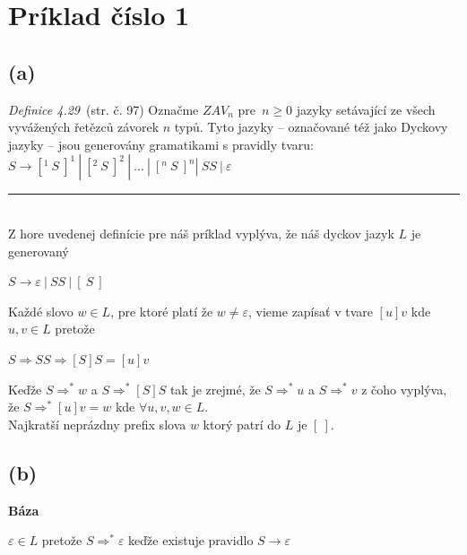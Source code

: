 \documentclass[11pt,a4paper]{article}
\begin{document}
\newpage
\section{Príklad číslo 1} %

\subsection{(a)}\label{sec:a}
\textit{Definice 4.29}~\cite{TIN}(str. č. 97) Označme $ZAV_n$ pre $n \geq 0$ jazyky setávající ze všech vyvážených řetězců závorek $n$ typů. Tyto jazyky -- označované též jako Dyckovy jazyky -- jsou generovány gramatikami s pravidly tvaru: $S \rightarrow [^{1}\ S\ ]^{1} \ |\  [^{2}\ S\ ]^{2} \ |\  ... \ |\  [^{n}\ S\ ]^{n} | \ SS \ | \ \varepsilon $

\rule{17cm}{0.4pt}

\hfill\\[-2em]

Z hore uvedenej definície pre náš príklad vyplýva, že náš dyckov jazyk $L$ je generovaný
\begin{center}
$S \rightarrow \varepsilon \ | \ SS \ | \ [\ S \ ]$
\end{center}

Každé slovo $w \in L$, pre ktoré platí že $w \neq \varepsilon$, vieme zapísať v tvare $[u]v$ kde $u,v \in L$ pretože
\begin{center}
$S \Rightarrow SS \Rightarrow [S]S = [u]v$
\end{center}

Keďže $S \Rightarrow^{*} w$ a $S \Rightarrow^{*} [S]S$ tak je zrejmé, že $S \Rightarrow^{*} u$ a $S \Rightarrow^{*} v$ z čoho vyplýva, že $S \Rightarrow^{*} [u]v = w$ kde $\forall u,v,w \in L$.\\

Najkratší neprázdny prefix slova $w$ ktorý patrí do $L$ je $[\ ]$.

\subsection{(b)}

\textbf{Báza}
\begin{flushright}
\begin{minipage}{0.95\textwidth}
    $\varepsilon \in L$ pretože $S \Rightarrow^{*} \varepsilon$ keďže existuje pravidlo $S \rightarrow \varepsilon$\\
\end{minipage}
\end{flushright}
\end{document}
